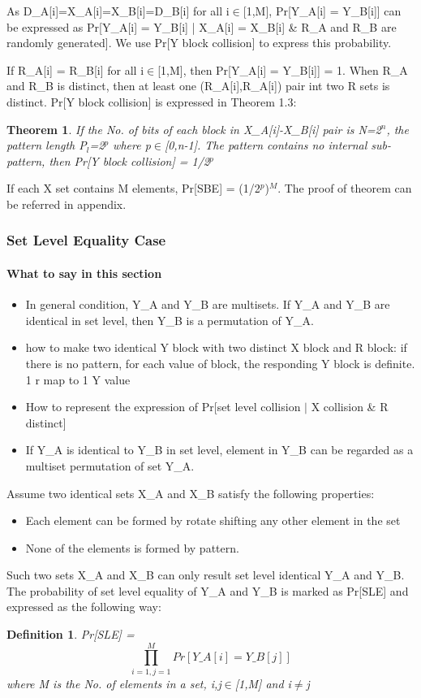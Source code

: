 \documentclass{article}
\newtheorem{theorem}{Theorem}[section]
\newtheorem{defination}{Definition}[section]
\begin{document}
As D\_A[i]=X\_A[i]=X\_B[i]=D\_B[i] for all i$\in$[1,M], Pr[Y\_A[i] = Y\_B[i]] can be expressed as Pr[Y\_A[i] = Y\_B[i] | X\_A[i] = X\_B[i] \& R\_A and R\_B are randomly generated]. We use Pr[Y block collision] to express this probability. 

If R\_A[i] = R\_B[i] for all i$\in$[1,M], then Pr[Y\_A[i] = Y\_B[i]] = 1. When R\_A and R\_B is distinct, then at least one (R\_A[i],R\_A[i]) pair int two R sets is distinct.  Pr[Y block collision] is expressed in Theorem 1.3:
\begin{theorem}
If the No. of bits of each block in X\_A[i]-X\_B[i] pair is N=2$^n$, the pattern length P$_l$=2$^p$ where p$\in$[0,n-1]. The pattern contains no internal sub-pattern, then Pr[Y block collision] = 1/2$^p$
\end{theorem}
If each X set contains M elements, Pr[SBE] = (1/2$^p$)$^M$.
The proof of theorem can be referred in appendix.

\subsubsection{Set Level Equality Case}
\paragraph{What to say in this section}
\begin{itemize}
	\item In general condition, Y\_A and Y\_B are multisets. If Y\_A and Y\_B are identical in set level, then Y\_B is a permutation of Y\_A.
	\item how to make two identical Y block with two distinct X block and R block: if there is no pattern, for each value of block, the responding Y block is definite. 1 r map to 1 Y value
	\item How to represent the expression of Pr[set level collision $\mid$ X collision \& R distinct]
	\item If Y\_A is identical to Y\_B in set level, element in Y\_B can be regarded as a multiset permutation of set Y\_A.
\end{itemize}

Assume two identical sets X\_A and X\_B satisfy the following properties:
\begin{itemize}
	\item Each element can be formed by rotate shifting any other element in the set
	\item None of the elements is formed by pattern.
\end{itemize}
Such two sets X\_A and X\_B can only result set level identical Y\_A and Y\_B.
The probability of set level equality of Y\_A and Y\_B is marked as Pr[SLE] and expressed as the following way:
\begin{defination}
Pr[SLE] = $$\prod_{i=1,j=1}^M Pr[Y\_A[i] = Y\_B[j]]$$ where M is the No. of elements in a set, i,j$\in$[1,M] and i$\neq$j
\end{defination} 
\end{document}
